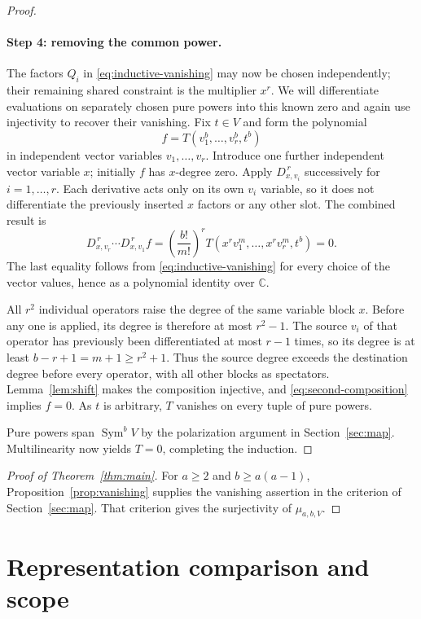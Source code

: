 \documentclass[11pt]{article}
\theoremstyle{remark}
\DeclareMathOperator{\Sym}{Sym}
\newcommand{\C}{\mathbb C}
\newcommand{\D}[2]{D_{#1,#2}}
\begin{document}
\begin{proof}
\paragraph{Step 4: removing the common power.}
The factors $Q_i$ in \eqref{eq:inductive-vanishing} may now be chosen
independently; their remaining shared constraint is the multiplier $x^r$.
We will differentiate evaluations on separately chosen pure powers into this known
zero and again use injectivity to recover their vanishing. Fix $t\in V$ and
form the polynomial
\[
 f=T(v_1^b,\ldots,v_r^b,t^b)
\]
in independent vector variables $v_1,\ldots,v_r$. Introduce one further
independent vector variable $x$; initially $f$ has $x$-degree zero.
Apply $\D{x}{v_i}^{\,r}$ successively for $i=1,\ldots,r$. Each derivative
acts only on its own $v_i$ variable, so it does not differentiate the
previously inserted $x$ factors or any other slot. The combined result is
\begin{equation}\label{eq:second-composition}
 \D{x}{v_r}^{\,r}\cdots\D{x}{v_1}^{\,r}f
 =\left(\frac{b!}{m!}\right)^r
 T(x^rv_1^m,\ldots,x^rv_r^m,t^b)=0.
\end{equation}
The last equality follows from \eqref{eq:inductive-vanishing} for every
choice of the vector values, hence as a polynomial identity over $\C$.

All $r^2$ individual operators raise the degree of the same variable block
$x$. Before any one is applied, its degree is therefore at most $r^2-1$.
The source $v_i$ of that operator has previously been differentiated at
most $r-1$ times, so its degree is at least
$b-r+1=m+1\ge r^2+1$. Thus the source degree exceeds the destination degree
before every operator, with all other blocks as spectators.
Lemma~\ref{lem:shift} makes the composition injective, and
\eqref{eq:second-composition} implies $f=0$.
As $t$ is arbitrary, $T$ vanishes on every tuple of pure powers.

Pure powers span $\Sym^b V$ by the polarization argument in
Section~\ref{sec:map}. Multilinearity now yields $T=0$, completing the
induction.
\end{proof}

\begin{proof}[Proof of Theorem~\ref{thm:main}]
For $a\ge2$ and $b\ge a(a-1)$, Proposition~\ref{prop:vanishing} supplies
the vanishing assertion in the criterion of Section~\ref{sec:map}.
That criterion gives the surjectivity of $\mu_{a,b,V}$.
\end{proof}

\section{Representation comparison and scope}\label{sec:comparison}
\end{document}
